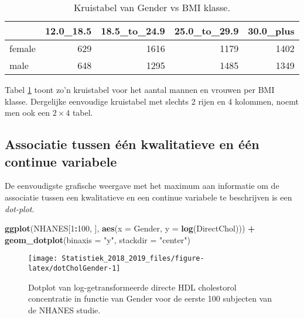 \documentclass[12pt,dutch,coursenotes]{book}
\newenvironment{Shaded}{\begin{snugshade}}{\end{snugshade}}
\newcommand{\KeywordTok}[1]{\textcolor[rgb]{0.13,0.29,0.53}{\textbf{#1}}}
\newcommand{\DataTypeTok}[1]{\textcolor[rgb]{0.13,0.29,0.53}{#1}}
\newcommand{\DecValTok}[1]{\textcolor[rgb]{0.00,0.00,0.81}{#1}}
\newcommand{\StringTok}[1]{\textcolor[rgb]{0.31,0.60,0.02}{#1}}
\newcommand{\OperatorTok}[1]{\textcolor[rgb]{0.81,0.36,0.00}{\textbf{#1}}}
\newcommand{\NormalTok}[1]{#1}
\theoremstyle{definition}
\theoremstyle{definition}
\theoremstyle{definition}
\theoremstyle{remark}
\begin{document}
\begin{table}

\caption{\label{tab:genderBMI}Kruistabel van Gender vs BMI klasse.}
\centering
\begin{tabular}[t]{lrrrr}
\toprule
  & 12.0\_18.5 & 18.5\_to\_24.9 & 25.0\_to\_29.9 & 30.0\_plus\\
\midrule
female & 629 & 1616 & 1179 & 1402\\
male & 648 & 1295 & 1485 & 1349\\
\bottomrule
\end{tabular}
\end{table}

Tabel \ref{tab:genderBMI} toont zo'n kruistabel voor het aantal mannen
en vrouwen per BMI klasse. Dergelijke eenvoudige kruistabel met slechts
2 rijen en 4 kolommen, noemt men ook een \(2\times 4\) tabel.

\subsection{Associatie tussen één kwalitatieve en één continue
variabele}\label{subsec:asskwalcont}

De eenvoudigste grafische weergave met het maximum aan informatie om de
associatie tussen een kwalitatieve en een continue variabele te
beschrijven is een \emph{dot-plot}.

\begin{Shaded}
\begin{Highlighting}[]
\KeywordTok{ggplot}\NormalTok{(NHANES[}\DecValTok{1}\OperatorTok{:}\DecValTok{100}\NormalTok{, ], }\KeywordTok{aes}\NormalTok{(}\DataTypeTok{x =}\NormalTok{ Gender, }\DataTypeTok{y =} \KeywordTok{log}\NormalTok{(DirectChol))) }\OperatorTok{+}\StringTok{ }
\StringTok{    }\KeywordTok{geom_dotplot}\NormalTok{(}\DataTypeTok{binaxis =} \StringTok{"y"}\NormalTok{, }\DataTypeTok{stackdir =} \StringTok{"center"}\NormalTok{)}
\end{Highlighting}
\end{Shaded}

\begin{figure}

{\centering \texttt{[image: Statistiek\_2018\_2019\_files/figure-latex/dotCholGender-1]} 

}

\caption{Dotplot van log-getransformeerde directe HDL cholestorol concentratie in functie van Gender voor de eerste 100 subjecten van de NHANES studie.}\label{fig:dotCholGender}
\end{figure}
\end{document}
